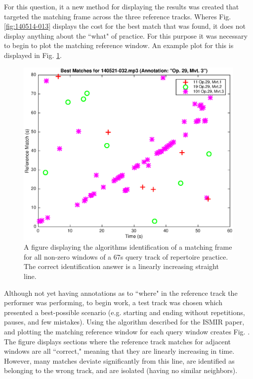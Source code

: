 \documentclass{article}
\begin{document}
For this question, it a new method for displaying the results was created that targeted the matching frame across the three reference tracks. Wheres Fig. \ref{fig:140514-013} displays the cost for the best match that was found, it does not display anything about the ``what" of practice. For this purpose it was necessary to begin to plot the matching reference window. An example plot for this is displayed in Fig. \ref{fig:noReduction}.

\begin{figure}[ht!]
\includegraphics[width=\linewidth]{figs/noReduction.eps}
\caption{A figure displaying the algorithms identification of a matching frame for all non-zero windows of a 67s query track of repertoire practice. The correct identification answer is a linearly increasing straight line.}
\label{fig:noReduction}
\end{figure}

Although not yet having annotations as to ``where" in the reference track the performer was performing, to begin work, a test track was chosen which presented a best-possible scenario (e.g. starting and ending without repetitions, pauses, and few mistakes). Using the algorithm described for the ISMIR paper, and plotting the matching reference window for each query window creates Fig. \label{fig:noReduction}. The figure displays sections where the reference track matches for adjacent windows are all ``correct," meaning that they are linearly increasing in time. However, many matches deviate significantly from this line, are identified as belonging to the wrong track, and are isolated (having no similar neighbors).
\end{document}
